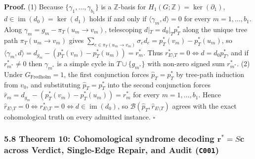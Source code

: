 \documentclass[
  11pt,
]{article}
\begin{document}
\textbf{Proof.} (1) Because
\(\{\gamma_1,\allowbreak  \dots,\allowbreak  \gamma_{b_1}\}\) is a
\(\mathbb{Z}\)-basis for \(H_1(G; \mathbb{Z}) = \ker(\partial_1)\),
\(d \in \operatorname{im}(d_0) = \ker(d_1)\) holds if and only if
\(\langle \gamma_m,\allowbreak  d \rangle = 0\) for every
\(m = 1,\allowbreak  \dots,\allowbreak  b_1\). Along
\(\gamma_m = g_m - \pi_T(u_m \to v_m)\), telescoping
\(d|_T = d_0|_T p_T^*\) along the unique tree path
\(\pi_T(u_m \to v_m)\) gives
\(\sum_{e \in \pi_T(u_m \to v_m)} \sigma_{e} d_e = p_T^*(v_m) - p_T^*(u_m)\),
so
\(\langle \gamma_m,\allowbreak  d \rangle = d_{g_m} - (p_T^*(v_m) - p_T^*(u_m)) = r_m^*\).
Thus \(r_{E \setminus T}^* = 0 \iff d = d_0 p_T^*\), and if
\(r_{m^*}^* \ne 0\) then \(\gamma_{m^*}\) is a simple cycle in
\(T \cup \{g_{m^*}\}\) with non-zero signed sum \(r_{m^*}^*\). (2) Under
\(G_{\text{Fredholm}} = 1\), the first conjunction forces
\(\hat{p}_T = p_T^*\) by tree-path induction from \(v_0\), and
substituting \(\hat{p}_T = p_T^*\) into the second conjunction forces
\(\hat{r}_m = d_{g_m} - (p_T^*(v_m) - p_T^*(u_m)) = r_m^*\) for every
\(m = 1,\allowbreak  \dots,\allowbreak  b_1\). Hence
\(\hat{r}_{E \setminus T} = 0 \iff r_{E \setminus T}^* = 0 \iff d \in \operatorname{im}(d_0)\),
so \(\mathcal{B}(\hat{p}_T,\allowbreak  \hat{r}_{E \setminus T})\)
agrees with the exact cohomological truth on every admitted instance.
\(\square\)

\subsubsection{\texorpdfstring{5.8 Theorem 10: Cohomological syndrome
decoding \(\mathbf{r}^* = S\mathbf{c}\) across Verdict, Single-Edge
Repair, and Audit
(\texttt{C001})}{5.8 Theorem 10: Cohomological syndrome decoding \textbackslash mathbf\{r\}\^{}* = S\textbackslash mathbf\{c\} across Verdict, Single-Edge Repair, and Audit (C001)}}\label{theorem-10-cohomological-syndrome-decoding-mathbfr-smathbfc-across-verdict-single-edge-repair-and-audit-c001}
\end{document}
